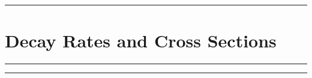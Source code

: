 \noindent\rule{7in}{2.8pt}
\section{Decay Rates and Cross Sections}

\begin{problem}{1}

\end{problem}

\begin{solution}

\end{solution} 
\noindent\rule{7in}{1.5pt}


\begin{problem}{2}

\end{problem}

\begin{solution}

\end{solution} 

\noindent\rule{7in}{1.5pt}


    